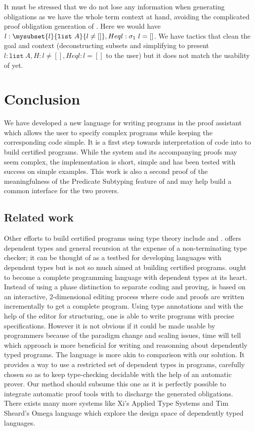 \documentclass{llncs}
\begin{document}
It must be stressed that we do not lose any information when
generating obligations as we have the whole term context at hand,
avoiding the complicated proof obligation generation of \PVS \cite{PVS-Semantics:TR}.
Here we would have $l : \mysubset{l}{\texttt{list}~A}{l \neq []}, Heql : \eltpit~l =
[]$. We have tactics that clean the goal and context (deconstructing
subsets and simplifying to present $l : \texttt{list}~A, H : l \neq [], Heql : l = []$
to the user) but it does not match the usability of \PVS yet.


\section{Conclusion}
\label{sec:Conclusion}
We have developed a new language for writing programs in the \Coq proof
assistant which allows the user to specify complex programs while
keeping the corresponding code simple. It is a first step towards
interpretation of \ML code into \Coq to build certified
programs. While the system and its accompanying proofs may seem complex, the
implementation is short, simple and has been tested with success on
simple examples. This work is also a second proof of the
meaningfulness of the Predicate Subtyping feature of \PVS{} and may
help build a common interface for the two provers. 

\subsection{Related work}
Other efforts to build certified programs using type theory include
\Cayenne \cite{Augustsson99} and \Epigram
\cite{DBLP:journals/jfp/McBrideM04}. \Cayenne offers dependent
types and general recursion at the expense of a non-terminating type
checker; it can be thought of as a testbed for developing languages with
dependent types but is not so much aimed at building certified programs.
\Epigram ought to become a complete programming language with dependent
types at its heart. Instead of using a phase distinction to separate
coding and proving, \Epigram is based on an interactive, 2-dimensional editing process
where code and proofs are written incrementally to get a complete program.
Using type annotations and with the help of the editor for structuring, 
one is able to write programs with precise specifications. However it
is not obvious if it could be made usable by programmers because of the
paradigm change and scaling issues, time will tell which approach is
more beneficial for writing and reasonning about dependently typed
programs. The \DML language \cite{Xi98:PhD} is more akin to
comparison with our solution. It provides a way to use a restricted set
of dependent types in \ML programs, carefully chosen so as to keep
type-checking decidable with the help of an automatic prover. Our method
should subsume this one as it is perfectly possible to integrate automatic
proof tools with \Coq to discharge the generated obligations. There
exists many more systems like Xi's Applied Type Systems and Tim Sheard's
Omega language which explore the design space of dependently typed languages.
\end{document}
